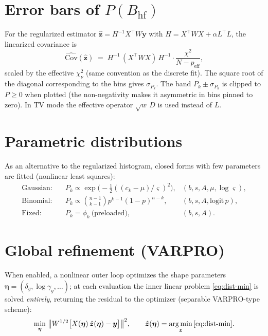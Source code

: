 \documentclass[11pt,a4paper]{article}
\newcommand{\BHF}{B_{\mathrm{hf}}}
\DeclareMathOperator*{\argmin}{arg\,min}
\begin{document}
\section{Error bars of \texorpdfstring{$P(\BHF)$}{P(BHF)}}\label{sec:perr}

For the regularized estimator $\hat{\bm z}=H^{-1}X^\top W\bm y$ with
$H=X^\top WX+\alpha L^\top L$, the linearized covariance is
\begin{equation}
  \widehat{\mathrm{Cov}}(\hat{\bm z}) \;=\; H^{-1}\,(X^\top WX)\,H^{-1}\cdot\frac{\chi^2}{N-p_{\text{eff}}},
\end{equation}
scaled by the effective $\chi^2_\nu$ (same convention as the discrete fit). The
square root of the diagonal corresponding to the bins gives $\sigma_{P_k}$. The band
$P_k\pm\sigma_{P_k}$ is clipped to $P\ge0$ when plotted (the non-negativity makes
it asymmetric in bins pinned to zero). In TV mode the effective operator
$\sqrt{w}\,D$ is used instead of $L$.

\section{Parametric distributions}
As an alternative to the regularized histogram, closed forms with few
parameters are fitted (nonlinear least squares):
\begin{align}
  \text{Gaussian:}\quad & P_k\propto \exp\!\bigl(-\tfrac12((c_k-\mu)/\varsigma)^2\bigr), & (b,s,A,\mu,\log\varsigma),\\
  \text{Binomial:}\quad & P_k\propto \binom{n-1}{k-1}p^{k-1}(1-p)^{n-k}, & (b,s,A,\mathrm{logit}\,p),\\
  \text{Fixed:}\quad & P_k=\phi_k\ \text{(preloaded)}, & (b,s,A).
\end{align}

\section{Global refinement (VARPRO)}\label{sec:refine}
When enabled, a nonlinear outer loop optimizes the shape parameters
$\bm\eta=(\delta_g,\log\gamma_g,\dots)$; at each evaluation the inner linear
problem \eqref{eq:dist-min} is solved \emph{entirely}, returning the
residual to the optimizer (separable VARPRO-type scheme):
\begin{equation}
  \min_{\bm\eta}\;\bigl\|W^{1/2}\bigl[X(\bm\eta)\,\hat{\bm z}(\bm\eta)-\bm y\bigr]\bigr\|^2,
  \qquad \hat{\bm z}(\bm\eta)=\argmin_{\bm z}\eqref{eq:dist-min}.
\end{equation}
\end{document}
